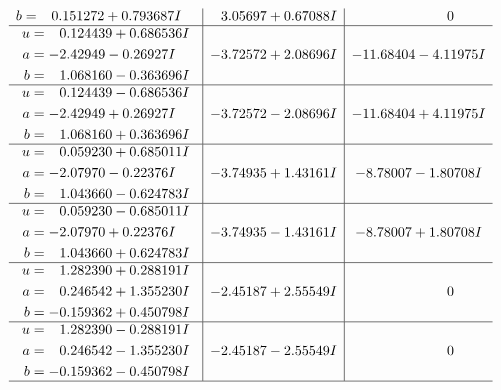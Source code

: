 \documentclass[1p]{elsarticle_modified}
\theoremstyle{definition}
\begin{document}
$$\begin{array}{c|c|c}
\begin{aligned}
b &= \phantom{-}0.151272 + 0.793687 I\end{aligned}
 & \phantom{-}3.05697 + 0.67088 I & \phantom{-0.000000 } 0 \\ \hline\begin{aligned}
u &= \phantom{-}0.124439 + 0.686536 I \\
a &= -2.42949 - 0.26927 I \\
b &= \phantom{-}1.068160 - 0.363696 I\end{aligned}
 & -3.72572 + 2.08696 I & -11.68404 - 4.11975 I \\ \hline\begin{aligned}
u &= \phantom{-}0.124439 - 0.686536 I \\
a &= -2.42949 + 0.26927 I \\
b &= \phantom{-}1.068160 + 0.363696 I\end{aligned}
 & -3.72572 - 2.08696 I & -11.68404 + 4.11975 I \\ \hline\begin{aligned}
u &= \phantom{-}0.059230 + 0.685011 I \\
a &= -2.07970 - 0.22376 I \\
b &= \phantom{-}1.043660 - 0.624783 I\end{aligned}
 & -3.74935 + 1.43161 I & -8.78007 - 1.80708 I \\ \hline\begin{aligned}
u &= \phantom{-}0.059230 - 0.685011 I \\
a &= -2.07970 + 0.22376 I \\
b &= \phantom{-}1.043660 + 0.624783 I\end{aligned}
 & -3.74935 - 1.43161 I & -8.78007 + 1.80708 I \\ \hline\begin{aligned}
u &= \phantom{-}1.282390 + 0.288191 I \\
a &= \phantom{-}0.246542 + 1.355230 I \\
b &= -0.159362 + 0.450798 I\end{aligned}
 & -2.45187 + 2.55549 I & \phantom{-0.000000 } 0 \\ \hline\begin{aligned}
u &= \phantom{-}1.282390 - 0.288191 I \\
a &= \phantom{-}0.246542 - 1.355230 I \\
b &= -0.159362 - 0.450798 I\end{aligned}
 & -2.45187 - 2.55549 I & \phantom{-0.000000 } 0\\
 \hline 
 \end{array}$$\newpage$$\begin{array}{c|c|c}  

\end{array}$$
\end{document}
